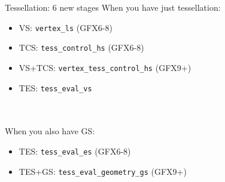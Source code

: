 \documentclass[aspectratio=169,t,xcolor=table]{beamer}
\begin{document}
\begin{frame}{Tessellation: 6 new stages}
    \normalsize
    When you have just tessellation:
    \LARGE
    \begin{itemize}
        \item VS: \texttt{vertex\_ls} (GFX6-8)
        \item TCS: \texttt{tess\_control\_hs} (GFX6-8)
        \item VS+TCS: \texttt{vertex\_tess\_control\_hs} (GFX9+)
        \item TES: \texttt{tess\_eval\_vs}
    \end{itemize}
    \normalsize
    \ \\
    \ \\
    When you also have GS:
    \LARGE
    \begin{itemize}
        \item TES: \texttt{tess\_eval\_es} (GFX6-8)
        \item TES+GS: \texttt{tess\_eval\_geometry\_gs} (GFX9+)
    \end{itemize}
%        
%        
\end{frame}
\end{document}
